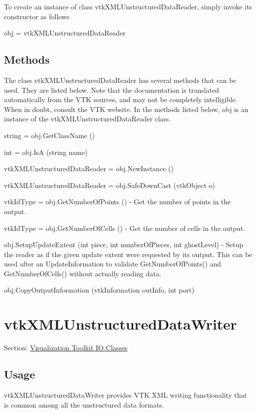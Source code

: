 To create an instance of class vtk\-X\-M\-L\-Unstructured\-Data\-Reader, simply invoke its constructor as follows \begin{DoxyVerb}  obj = vtkXMLUnstructuredDataReader
\end{DoxyVerb}
 \hypertarget{vtkwidgets_vtkxyplotwidget_Methods}{}\subsection{Methods}\label{vtkwidgets_vtkxyplotwidget_Methods}
The class vtk\-X\-M\-L\-Unstructured\-Data\-Reader has several methods that can be used. They are listed below. Note that the documentation is translated automatically from the V\-T\-K sources, and may not be completely intelligible. When in doubt, consult the V\-T\-K website. In the methods listed below, {\ttfamily obj} is an instance of the vtk\-X\-M\-L\-Unstructured\-Data\-Reader class. 
\begin{DoxyItemize}
\item {\ttfamily string = obj.\-Get\-Class\-Name ()}  
\item {\ttfamily int = obj.\-Is\-A (string name)}  
\item {\ttfamily vtk\-X\-M\-L\-Unstructured\-Data\-Reader = obj.\-New\-Instance ()}  
\item {\ttfamily vtk\-X\-M\-L\-Unstructured\-Data\-Reader = obj.\-Safe\-Down\-Cast (vtk\-Object o)}  
\item {\ttfamily vtk\-Id\-Type = obj.\-Get\-Number\-Of\-Points ()} -\/ Get the number of points in the output.  
\item {\ttfamily vtk\-Id\-Type = obj.\-Get\-Number\-Of\-Cells ()} -\/ Get the number of cells in the output.  
\item {\ttfamily obj.\-Setup\-Update\-Extent (int piece, int number\-Of\-Pieces, int ghost\-Level)} -\/ Setup the reader as if the given update extent were requested by its output. This can be used after an Update\-Information to validate Get\-Number\-Of\-Points() and Get\-Number\-Of\-Cells() without actually reading data.  
\item {\ttfamily obj.\-Copy\-Output\-Information (vtk\-Information out\-Info, int port)}  
\end{DoxyItemize}\hypertarget{vtkio_vtkxmlunstructureddatawriter}{}\section{vtk\-X\-M\-L\-Unstructured\-Data\-Writer}\label{vtkio_vtkxmlunstructureddatawriter}
Section\-: \hyperlink{sec_vtkio}{Visualization Toolkit I\-O Classes} \hypertarget{vtkwidgets_vtkxyplotwidget_Usage}{}\subsection{Usage}\label{vtkwidgets_vtkxyplotwidget_Usage}
vtk\-X\-M\-L\-Unstructured\-Data\-Writer provides V\-T\-K X\-M\-L writing functionality that is common among all the unstructured data formats.

